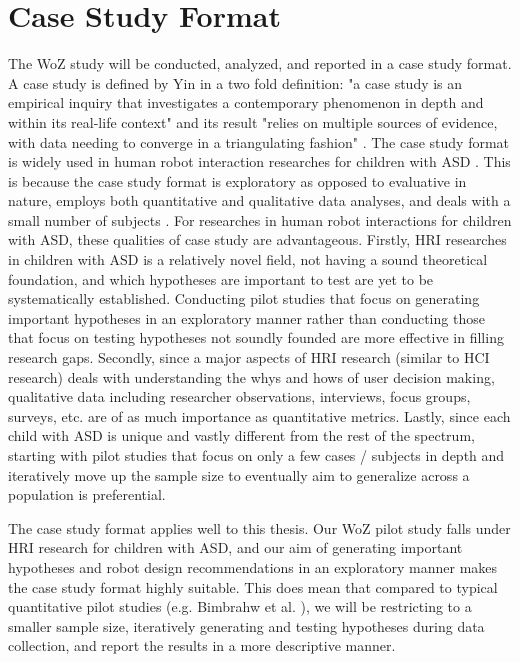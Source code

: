 \section{Case Study Format}

The WoZ study will be conducted, analyzed, and reported in a case study format.  A case study is defined by Yin in a two fold definition: "a case study is an empirical inquiry that investigates a contemporary phenomenon in depth and within its real-life context" and its result "relies on multiple sources of evidence, with data needing to converge in a triangulating fashion" \cite{yin2013case}.  The case study format is widely used in human robot interaction researches for children with ASD \cite{kozima2005interactive, robins2004robot, robins2009isolation}.  This is because the case study format is exploratory as opposed to evaluative in nature, employs both quantitative and qualitative data analyses, and deals with a small number of subjects \cite{yin2013case}.  For researches in human robot interactions for children with ASD, these qualities of case study are advantageous.  Firstly, HRI researches in children with ASD is a relatively novel field, not having a sound theoretical foundation, and which hypotheses are important to test are yet to be systematically established.  Conducting pilot studies that focus on generating important hypotheses in an exploratory manner rather than conducting those that focus on testing hypotheses not soundly founded are more effective in filling research gaps.  Secondly, since a major aspects of HRI research (similar to HCI research) deals with understanding the whys and hows of user decision making, qualitative data including researcher observations, interviews, focus groups, surveys, etc. are of as much importance as quantitative metrics.  Lastly, since each child with ASD is unique and vastly different from the rest of the spectrum, starting with pilot studies that focus on only a few cases / subjects in depth and iteratively move up the sample size to eventually aim to generalize across a population is preferential.

The case study format applies well to this thesis.  Our WoZ pilot study falls under HRI research for children with ASD, and our aim of generating important hypotheses and robot design recommendations in an exploratory manner makes the case study format highly suitable.  This does mean that compared to typical quantitative pilot studies (e.g. Bimbrahw et al. \cite{bimbrahw2012investigating}), we will be restricting to a smaller sample size, iteratively generating and testing hypotheses during data collection, and report the results in a more descriptive manner.
